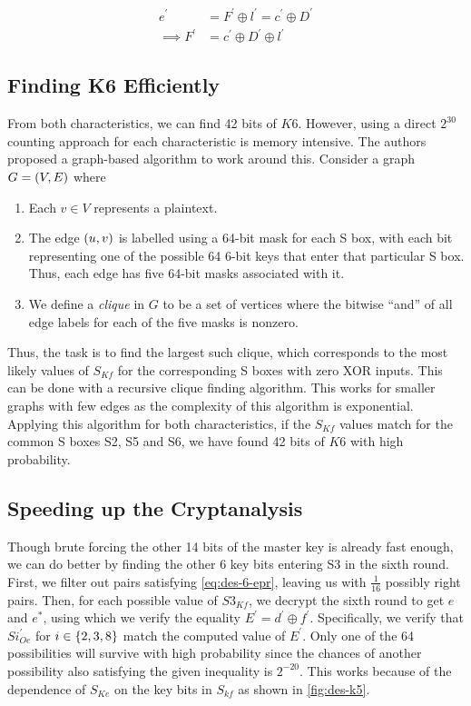 \documentclass[twoside]{article}
\begin{document}
\begin{align}
    e^\prime &= F^\prime \oplus l^\prime = c^\prime \oplus D^\prime \\
    \implies F^\prime &= c^\prime \oplus D^\prime \oplus l^\prime
    \label{eq:des-6-epr}
\end{align}

\subsection{Finding K6 Efficiently}

From both characteristics, we can find 42 bits of \(K6\). However, using a 
direct \(2^{30}\) counting approach for each characteristic is memory
intensive. The authors proposed a graph-based algorithm to work around this.
Consider a graph \(G = (V, E)\) where

\begin{enumerate}
    \item Each \(v \in V\) represents a plaintext.
    \item The edge \((u, v)\) is labelled using a 64-bit mask for each S 
    box, with each bit representing one of the possible 64 6-bit keys that 
    enter that particular S box. Thus, each edge has five 64-bit masks 
    associated with it.
    \item We define a \emph{clique} in \(G\) to be a set of vertices where the 
    bitwise ``and'' of all edge labels for each of the five masks is nonzero.
\end{enumerate}

Thus, the task is to find the largest such clique, which corresponds to the 
most likely values of \(S_{Kf}\) for the corresponding S boxes with zero XOR 
inputs. This can be done with a recursive clique finding algorithm. This works
for smaller graphs with few edges as the complexity of this algorithm is
exponential. Applying this algorithm for both characteristics, if the 
\(S_{Kf}\) values match for the common S boxes S2, S5 and S6, we have found
42 bits of \(K6\) with high probability.

\subsection{Speeding up the Cryptanalysis}

Though brute forcing the other 14 bits of the master key is already fast 
enough, we can do better by finding the other 6 key bits entering S3 in the 
sixth round. First, we filter out pairs satisfying \eqref{eq:des-6-epr}, 
leaving us with \(\frac{1}{16}\) possibly right pairs. Then, for each possible
value of \(S3_{Kf}\), we decrypt the sixth round to get \(e\) and \(e^*\),
using which we verify the equality \(E^\prime = d^\prime \oplus f^\prime\).
Specifically, we verify that \(Si^\prime_{Oe}\) for \(i \in \{2,3,8\}\)
match the computed value of \(E^\prime\). Only one of the 64 possibilities will
survive with high probability since the chances of another possibility also 
satisfying the given inequality is \(2^{-20}\). This works because of the 
dependence of \(S_{Ke}\) on the key bits in \(S_{kf}\) as shown in 
\autoref{fig:des-k5}.
\end{document}
